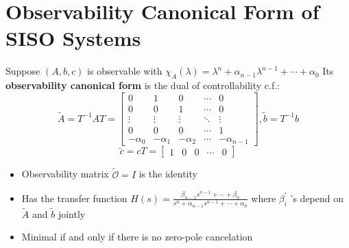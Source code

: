 \documentclass[10pt,a4paper,oneside]{article}
\begin{document}
\section{Observability Canonical Form of SISO Systems}
Suppose $(A, b, c)$ is observable with $\chi_{A}(\lambda)=\lambda^{n}+\alpha_{n-1} \lambda^{n-1}+\cdots+\alpha_{0}$
Its {\bfseries observability canonical form} is the dual of controllability c.f.:
\[
\tilde{A}=T^{-1} A T=\left[\begin{array}{ccccc}{0} & {1} & {0} & {\cdots} & {0} \\ {0} & {0} & {1} & {\cdots} & {0} \\ {\vdots} & {\vdots} & {\vdots} & {\ddots} & {\vdots} \\ {0} & {0} & {0} & {\cdots} & {1} \\ {-\alpha_{0}} & {-\alpha_{1}} & {-\alpha_{2}} & {\cdots} & {-\alpha_{n-1}}\end{array}\right], \tilde{b}=T^{-1} b
\]
\[
\tilde{c}=c T=\left[\begin{array}{lllll}{1} & {0} & {0} & {\cdots} & {0}\end{array}\right]
\]
\begin{itemize}
\item Observability matrix $\tilde{\mathcal{O}}=I$ is the identity
\item Has the transfer function $H(s)=\frac{\beta_{n-1} s^{n-1}+\cdots+\beta_{0}}{s^{n}+\alpha_{n-1} s^{n-1}+\cdots+\alpha_{0}}$ where $\beta_{i}^{\prime}$ 's depend on $\tilde{A}$ and $\tilde{b}$ jointly
\item Minimal if and only if there is no zero-pole cancelation
\end{itemize}
\end{document}
